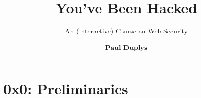 \documentclass[aspectratio=169]{beamer}
\title{\textbf{You've Been Hacked}}
\subtitle{An (Interactive) Course on Web Security\newline\vfill}
\author{\textbf{Paul Duplys}}
\institute[]{\faTwitter\hspace{0.1cm} @duplys \hspace{1cm} \faGithub\hspace{0.1cm} duplys \hspace{1cm} \faLinkedinSquare\hspace{0.1cm} linkedin.com/in/paulduplys/}
\date{}
\begin{document}
{
\begin{frame}
    \titlepage
\end{frame}
}

\begin{frame}
    \tableofcontents
\end{frame}

\section{0x0: Preliminaries}
\end{document}
